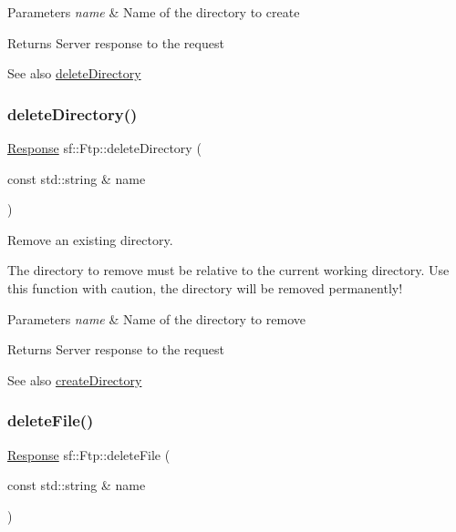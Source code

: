 \begin{DoxyParams}{Parameters}
{\em name} & Name of the directory to create\\
\hline
\end{DoxyParams}
\begin{DoxyReturn}{Returns}
Server response to the request
\end{DoxyReturn}
\begin{DoxySeeAlso}{See also}
\hyperlink{classsf_1_1_ftp_a2a8a7ef9144204b5b319c9a4be8806c2}{delete\+Directory} 
\end{DoxySeeAlso}
\mbox{\label{classsf_1_1_ftp_a2a8a7ef9144204b5b319c9a4be8806c2}} 
\subsubsection{\texorpdfstring{delete\+Directory()}{deleteDirectory()}}
{\footnotesize\ttfamily \hyperlink{classsf_1_1_ftp_1_1_response}{Response} sf\+::\+Ftp\+::delete\+Directory (\begin{DoxyParamCaption}\item[{const std\+::string \&}]{name }\end{DoxyParamCaption})}



Remove an existing directory. 

The directory to remove must be relative to the current working directory. Use this function with caution, the directory will be removed permanently!


\begin{DoxyParams}{Parameters}
{\em name} & Name of the directory to remove\\
\hline
\end{DoxyParams}
\begin{DoxyReturn}{Returns}
Server response to the request
\end{DoxyReturn}
\begin{DoxySeeAlso}{See also}
\hyperlink{classsf_1_1_ftp_a247b84c4b25da37804218c2b748c4787}{create\+Directory} 
\end{DoxySeeAlso}
\mbox{\label{classsf_1_1_ftp_a8aa272b0eb7769a850006e70fcad370f}} 
\subsubsection{\texorpdfstring{delete\+File()}{deleteFile()}}
{\footnotesize\ttfamily \hyperlink{classsf_1_1_ftp_1_1_response}{Response} sf\+::\+Ftp\+::delete\+File (\begin{DoxyParamCaption}\item[{const std\+::string \&}]{name }\end{DoxyParamCaption})}



